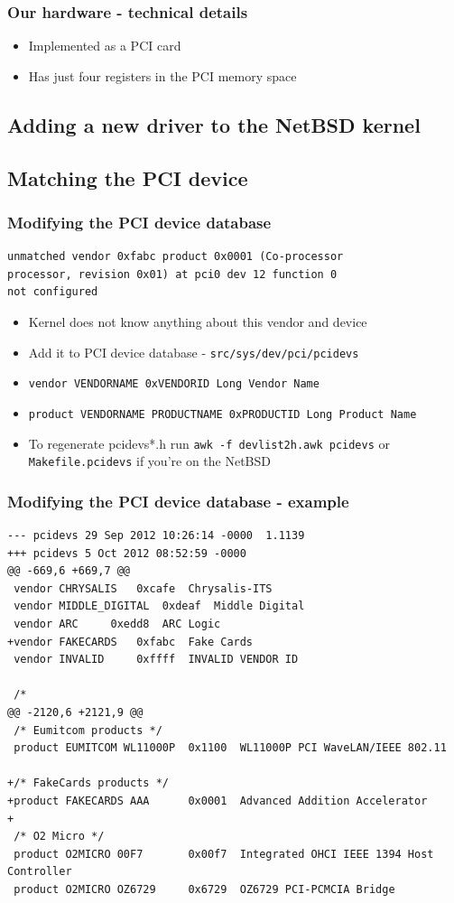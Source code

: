 \documentclass[dvipsnames,table]{beamer}
\begin{document}
\begin{frame}
\frametitle{Our hardware - technical details}
\begin{itemize}
	\item Implemented as a PCI card
	\item Has just four registers in the PCI memory space
\end{itemize}
\end{frame}

\subsection{Adding a new driver to the NetBSD kernel}

\subsection{Matching the PCI device}

\begin{frame}[fragile]
\frametitle{Modifying the PCI device database}
\begin{verbatim}
unmatched vendor 0xfabc product 0x0001 (Co-processor 
processor, revision 0x01) at pci0 dev 12 function 0 
not configured
\end{verbatim}
\begin{itemize}
	\item Kernel does not know anything about this vendor and device
	\item Add it to PCI device database - {\tt src/sys/dev/pci/pcidevs}
	\item {\tt vendor VENDORNAME 0xVENDORID Long Vendor Name}
	\item {\tt product VENDORNAME PRODUCTNAME 0xPRODUCTID	Long Product Name}
	\item To regenerate pcidevs*.h run {\tt awk -f devlist2h.awk pcidevs} or
{\tt Makefile.pcidevs} if you're on the NetBSD
\end{itemize}
\end{frame}

\begin{frame}[fragile]
\frametitle{Modifying the PCI device database - example}
\scriptsize
\begin{verbatim}
--- pcidevs	29 Sep 2012 10:26:14 -0000	1.1139
+++ pcidevs	5 Oct 2012 08:52:59 -0000
@@ -669,6 +669,7 @@
 vendor CHRYSALIS	0xcafe	Chrysalis-ITS
 vendor MIDDLE_DIGITAL	0xdeaf	Middle Digital
 vendor ARC		0xedd8	ARC Logic
+vendor FAKECARDS	0xfabc	Fake Cards
 vendor INVALID		0xffff	INVALID VENDOR ID
 
 /*
@@ -2120,6 +2121,9 @@
 /* Eumitcom products */
 product EUMITCOM WL11000P	0x1100	WL11000P PCI WaveLAN/IEEE 802.11
 
+/* FakeCards products */
+product FAKECARDS AAA		0x0001	Advanced Addition Accelerator
+
 /* O2 Micro */
 product O2MICRO 00F7		0x00f7	Integrated OHCI IEEE 1394 Host Controller
 product O2MICRO OZ6729		0x6729	OZ6729 PCI-PCMCIA Bridge
\end{verbatim}
\end{frame}
\end{document}
